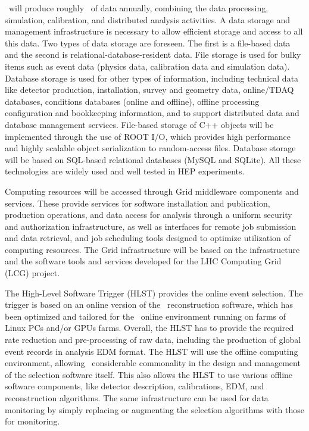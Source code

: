 \DSks\ will produce roughly \DSkAnnualDataProduction\ of data annually, combining the data processing, simulation, calibration, and distributed analysis activities.  A data storage and management infrastructure is necessary to allow efficient storage and access to all this data.  Two types of data storage are foreseen.  The first is a file-based data and the second is relational-database-resident data.  File storage is used for bulky items such as event data (physics data, calibration data and simulation data). Database storage is used for other types of information, including technical data like detector production, installation, survey and geometry data, online/TDAQ databases, conditions databases (online and offline), offline processing configuration and bookkeeping information, and to support distributed data and database management services. File-based storage of C++ objects will be implemented through the use of ROOT I/O, which provides high performance and highly scalable object serialization to random-access files. Database storage will be based on SQL-based relational databases (MySQL and SQLite). All these technologies are widely used and well tested in HEP experiments. 

Computing resources will be accessed through Grid middleware components and services.  These provide services for software installation and publication, production operations, and data access for analysis through a uniform security and authorization infrastructure, as well as interfaces for remote job submission and data retrieval, and job scheduling tools designed to optimize utilization of computing resources. The Grid infrastructure will be based on the infrastructure and the software tools and services developed for the LHC Computing Grid (LCG) project.

The High-Level Software Trigger (HLST) provides the online event selection. The  trigger is based on an online version of the \DSfs\ reconstruction software, which has been optimized and tailored for the \DSks\ online environment running on farms of Linux PCs and/or GPUs farms.  Overall, the HLST has to provide the required rate reduction and pre-processing of raw data, including the production of global event records in analysis EDM format. The HLST will use the offline computing environment, allowing \DSks\ considerable commonality in the design and management of the selection software itself.  This also allows the HLST to use various offline software components, like detector description, calibrations, EDM, and reconstruction algorithms.  The same infrastructure can be used for data monitoring by simply replacing or augmenting the selection algorithms with those for monitoring.

